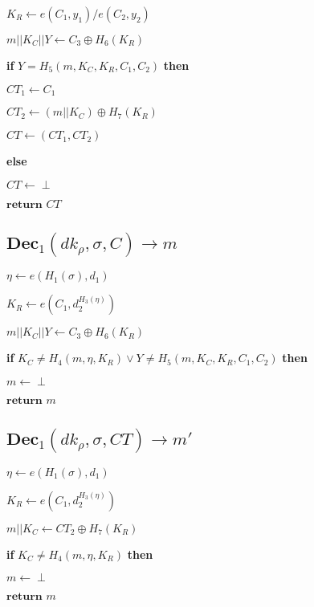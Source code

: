 \documentclass[a4paper]{article}
\begin{document}
$K_R \gets e(C_1, y_1) / e(C_2, y_2)$

$m || K_C || Y \gets C_3 \oplus H_6(K_R)$

\textbf{if }$Y = H_5(m, K_C, K_R, C_1, C_2)$\textbf{ then}

$\textit{CT}_1 \gets C_1$

$\textit{CT}_2 \gets (m || K_C) \oplus H_7(K_R)$

$\textit{CT} \gets (\textit{CT}_1, \textit{CT}_2)$

\textbf{else}

\quad$\textit{CT} \gets \perp$

$\textbf{return }\textit{CT}$

\subsection{$\textbf{Dec}_1(\textit{dk}_\rho, \sigma, C) \rightarrow m$}

$\eta \gets e(H_1(\sigma), d_1)$

$K_R \gets e(C_1, d_2^{H_3(\eta)})$

$m || K_C || Y \gets C_3 \oplus H_6(K_R)$

\textbf{if }$K_C \neq H_4(m, \eta, K_R) \lor Y \neq H_5(m, K_C, K_R, C_1, C_2)$\textbf{ then}

\quad$m \gets \perp$

$\textbf{return }m$

\subsection{$\textbf{Dec}_1(\textit{dk}_\rho, \sigma, \textit{CT}) \rightarrow m'$}

$\eta \gets e(H_1(\sigma), d_1)$

$K_R \gets e(C_1, d_2^{H_3(\eta)})$

$m || K_C \gets \textit{CT}_2 \oplus H_7(K_R)$

\textbf{if }$K_C \neq H_4(m, \eta, K_R)$\textbf{ then}

\quad$m \gets \perp$

$\textbf{return }m$
\end{document}
